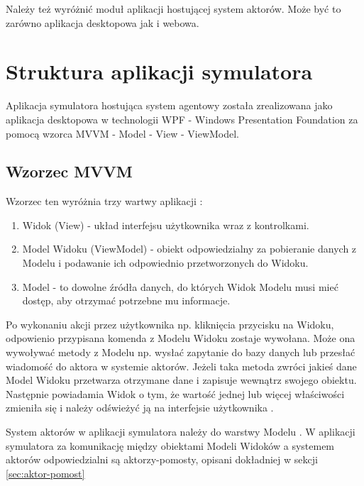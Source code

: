 Należy też wyróżnić moduł aplikacji hostującej system aktorów. 
Może być to zarówno aplikacja desktopowa jak i webowa. 

\section{Struktura aplikacji symulatora}
Aplikacja symulatora hostująca system agentowy została zrealizowana jako aplikacja desktopowa w technologii WPF - Windows Presentation Foundation za pomocą wzorca MVVM - Model - View - ViewModel.
\subsection{Wzorzec MVVM}
Wzorzec ten wyróżnia trzy wartwy aplikacji :
\begin{enumerate}
    \item Widok (View) - układ interfejsu użytkownika wraz z kontrolkami. 
    \item Model Widoku (ViewModel) - obiekt odpowiedzialny za pobieranie danych z Modelu i podawanie ich odpowiednio przetworzonych do Widoku. 
    \item Model - to dowolne źródła danych, do których Widok Modelu musi mieć dostęp, aby otrzymać potrzebne mu informacje. 
\end{enumerate}


Po wykonaniu akcji przez użytkownika np. kliknięcia przycisku na Widoku, odpowienio przypisana komenda z Modelu Widoku zostaje wywołana. 
Może ona wywoływać metody z Modelu np. wysłać zapytanie do bazy danych lub przesłać wiadomość do aktora w systemie aktorów.
Jeżeli taka metoda zwróci jakieś dane Model Widoku przetwarza otrzymane dane i zapisuje wewnątrz swojego obiektu. 
Następnie powiadamia Widok o tym, że wartość jednej lub więcej właściwości zmieniła się i należy odświeżyć ją na interfejsie użytkownika .


System aktorów w aplikacji symulatora należy do warstwy Modelu .
W aplikacji symulatora za komunikację między obiektami Modeli Widoków a systemem aktorów odpowiedzialni są aktorzy-pomosty, opisani dokładniej w sekcji \ref{sec:aktor-pomost}


